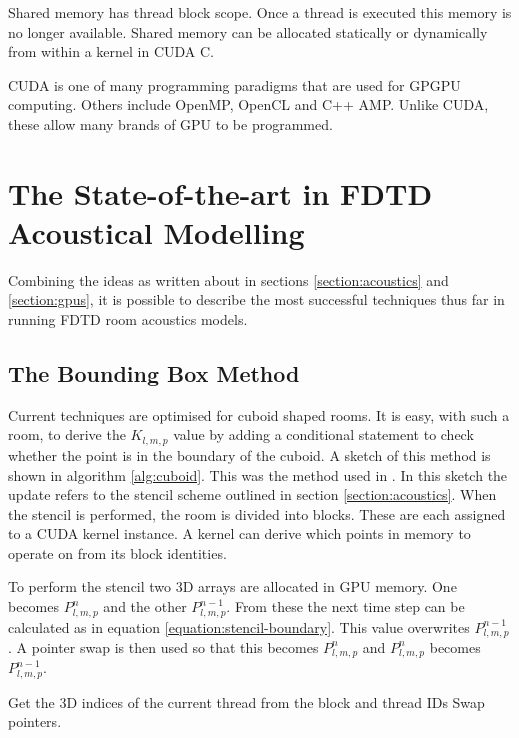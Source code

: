 \documentclass[12pt,a4paper]{report}
\begin{document}
Shared memory has thread block scope. Once a thread is executed this memory is no longer available. Shared memory can be allocated statically or dynamically from within a kernel in CUDA C.

CUDA is one of many programming paradigms that are used for GPGPU computing. Others include OpenMP, OpenCL and C++ AMP. Unlike CUDA, these allow many brands of GPU to be programmed.

\section{The State-of-the-art in FDTD Acoustical Modelling}
\label{chapter:state-of-art}
Combining the ideas as written about in sections \ref{section:acoustics} and \ref{section:gpus}, it is possible to describe the most successful techniques thus far in running FDTD room acoustics models.

\subsection{The Bounding Box Method}

Current techniques are optimised for cuboid shaped rooms. It is easy, with such a room, to derive the $K_{l,m,p}$ value by adding a conditional statement to check whether the point is in the boundary of the cuboid. A sketch of this method is shown in algorithm \ref{alg:cuboid}. This was the method used in \cite{craig}. In this sketch the update refers to the stencil scheme outlined in section \ref{section:acoustics}. When the stencil is performed, the room is divided into blocks. These are each assigned to a CUDA kernel instance. A kernel can derive which points in memory to operate on from its block identities.

To perform the stencil two 3D arrays are allocated in GPU memory. One becomes $P_{l,m,p}^{n}$ and the other $P_{l,m,p}^{n-1}$. From these the next time step can be calculated as in equation \ref{equation:stencil-boundary}. This value overwrites $P_{l,m,p}^{n-1}$. A pointer swap is then used so that this becomes $P_{l,m,p}^{n}$ and $P_{l,m,p}^{n}$ becomes $P_{l,m,p}^{n-1}$.

\IncMargin{1em}
\begin{algorithm}[H]
 Get the 3D indices of the current thread from the block and thread IDs\;
 Swap pointers.
 \caption{CUDA kernel for update on the basic 3D scheme.}
 \label{alg:cuboid}
\end{algorithm}
\end{document}
